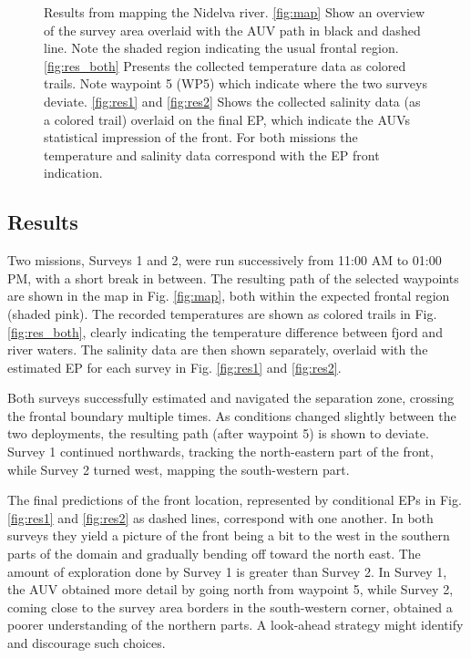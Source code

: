 \documentclass[aoas]{imsart}
\begin{document}
\begin{figure}[!h]
\caption{Results from mapping the Nidelva river. \ref{fig:map} Show an
  overview of the survey area overlaid with the AUV path in black and
  dashed line. Note the shaded region indicating the usual frontal
  region. \ref{fig:res_both} Presents the collected temperature data
  as colored trails. Note waypoint 5 (WP5) which indicate where the
  two surveys deviate. \ref{fig:res1} and \ref{fig:res2} Shows the
  collected salinity data (as a colored trail) overlaid on the final
  EP, which indicate the AUVs statistical impression of the front. For
  both missions the temperature and salinity data correspond with the
  EP front indication.}
\label{fig:results}
\end{figure}

\subsection{Results}

Two missions, Surveys 1 and 2, were run successively from 11:00 AM to
01:00 PM, with a short break in between. The resulting path of the
selected waypoints are shown in the map in Fig. \ref{fig:map}, both
within the expected frontal region (shaded pink). The recorded
temperatures are shown as colored trails in Fig. \ref{fig:res_both},
clearly indicating the temperature difference between fjord and river
waters. The salinity data are then shown separately, overlaid with the
estimated EP for each survey in Fig. \ref{fig:res1} and
\ref{fig:res2}.

Both surveys successfully estimated and navigated the separation zone,
crossing the frontal boundary multiple times. As conditions changed
slightly between the two deployments, the resulting path (after
waypoint 5) is shown to deviate. Survey 1 continued northwards,
tracking the north-eastern part of the front, while Survey 2 turned
west, mapping the south-western part.

The final predictions of the front location, represented by conditional EPs in
Fig. \ref{fig:res1} and \ref{fig:res2} as dashed lines, correspond
with one another. In both surveys they yield a picture of the front being a bit to the west in the southern parts of the domain and gradually bending off toward the north east. The amount of exploration done by Survey 1
is greater than Survey 2. In Survey 1, the AUV obtained more detail by
going north from waypoint 5, while Survey 2, coming close to the survey area borders
in the south-western corner, obtained a poorer understanding of the
northern parts. A look-ahead strategy might identify and
discourage such choices.
\end{document}
